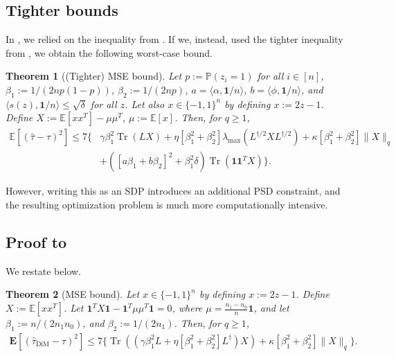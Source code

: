 \documentclass[12pt]{article}
\newtheorem{theorem}{Theorem}
\theoremstyle{definition}
\numberwithin{equation}{section}
\numberwithin{figure}{section}
\numberwithin{equation}{section}
\numberwithin{figure}{section}
\begin{document}
\subsection{Tighter bounds} \label{subsection_tighter_bounds} 

In , we relied on the inequality from . If we, instead, used the tighter inequality from , we obtain the following worst-case bound.

\begin{theorem}[(Tighter) MSE bound] \label{thm:tight_mse_bound_general_HT}
Let $p:= \mathbb{P}(z_i = 1)$ for all $i \in [n]$, $\beta_1 := 1/(2np(1-p))$, $\beta_2 := 1/(2np)$, $a = \langle \alpha, \mathbf{1}/n\rangle$, $b = \langle \phi, \mathbf{1}/n\rangle$, and $\langle s(z), \mathbf{1}/n\rangle \leq \sqrt{\delta}$ for all $z$. Let also $x \in \{-1, 1\}^n$ by defining $x := 2z-1$. Define  $X:=\mathbb{E}[xx^T] - \mu \mu^T$, $\mu := \mathbb{E}[x]$. Then, for $q \geq 1$,
     \begin{align*}
          \mathbb{E}[(\hat{\tau} -\tau)^2] \leq 7 \{ &\gamma \beta_1^2 \operatorname{Tr}(L X) +  \eta[\beta_1^2 + \beta_2^2] \lambda_{\max}(L^{\dagger/2} X L^{\dagger/2}) + \kappa[\beta_1^2 + \beta_2^2] \|X\|_{q} \\
          &+ ([a \beta_1 + b\beta_2]^2 + \beta_1^2 \delta) \operatorname{Tr}(\mathbf{1}\mathbf{1}^TX)\}.
     \end{align*}
\end{theorem}

However, writing this as an SDP introduces an additional PSD constraint, and the resulting optimization problem is much more computationally intensive. 


\subsection{Proof to } \label{proof_mse_bound_general_DiM}

We restate  below.

\begingroup
\renewcommand{\thetheorem}{\ref{thm:mse_bound_general_DiM}}
\begin{theorem}[MSE bound]
Let $x \in \{-1, 1\}^n$ by defining $x := 2z-1$. Define $X := \mathbb{E}[xx^T]$. Let $\mathbf{1}^T X \mathbf{1} - \mathbf{1}^T \mu \mu^T \mathbf{1} = 0$, where $\mu = \frac{n_1 - n_0}{n} \mathbf{1}$, and let $\beta_1:=   n/(2n_1 n_0)$, and  $\beta_2:= 1/(2 n_1)$. Then, for $q \geq 1$,
\begin{align*}
\mathbf{E}[(\hat{\tau}_{\text{DiM}} - \tau)^2] \leq 7 \{ \operatorname{Tr}((\gamma \beta_1^2 L + \eta[\beta_1^2 + \beta_2^2]L^\dagger) X) + \kappa[\beta_1^2 + \beta_2^2]\|X\|_{q} \}.
\end{align*}
\end{theorem}
\addtocounter{theorem}{-1}
\endgroup
\end{document}
